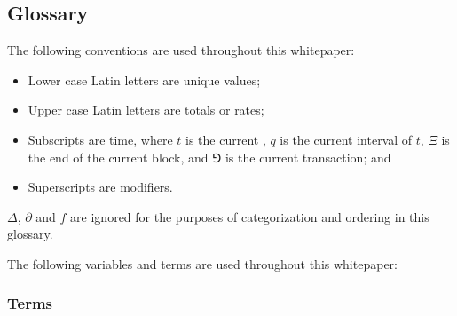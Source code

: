\documentclass[class=article, crop=false]{standalone}
\begin{document}

\subsection{Glossary}

The following conventions are used throughout this whitepaper:

\begin{itemize}
    \item Lower case Latin letters are unique values;
    \item Upper case Latin letters are totals or rates;
    \item Subscripts are time, where $t$ is the current , $q$ is the current interval of $t$, $\Xi$ is the end of the current block, and $\Game$ is the current transaction; and
    \item Superscripts are modifiers.
\end{itemize}

$\Delta$, $\partial$ and $f$ are ignored for the purposes of categorization and ordering in this glossary. 

The following variables and terms are used throughout this whitepaper:


\subsubsection{Terms}
\end{document}
